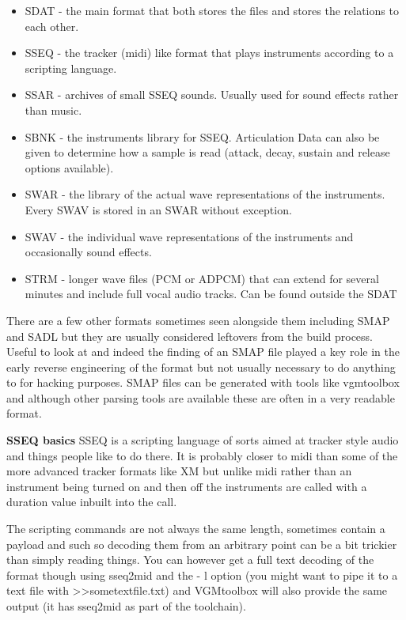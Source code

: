 \documentclass[
]{book}
\providecommand{\tightlist}{%
  \setlength{\itemsep}{0pt}\setlength{\parskip}{0pt}}
\begin{document}
\begin{itemize}
\tightlist
\item
  SDAT - the main format that both stores the files and stores the relations to each other.
\item
  SSEQ - the tracker (midi) like format that plays instruments according to a scripting language.
\item
  SSAR - archives of small SSEQ sounds. Usually used for sound effects rather than music.
\item
  SBNK - the instruments library for SSEQ. Articulation Data can also be given to determine how a sample is read (attack, decay, sustain and release options available).
\item
  SWAR - the library of the actual wave representations of the instruments. Every SWAV is stored in an SWAR without exception.
\item
  SWAV - the individual wave representations of the instruments and occasionally sound effects.
\item
  STRM - longer wave files (PCM or ADPCM) that can extend for several minutes and include full vocal audio tracks. Can be found outside the SDAT
\end{itemize}

There are a few other formats sometimes seen alongside them including SMAP and SADL but they are usually considered leftovers from the build process. Useful to look at and indeed the finding of an SMAP file played a key role in the early reverse engineering of the format but not usually necessary to do anything to for hacking purposes. SMAP files can be generated with tools like vgmtoolbox and although other parsing tools are available these are often in a very readable format.

\textbf{SSEQ basics} SSEQ is a scripting language of sorts aimed at tracker style audio and things people like to do there. It is probably closer to midi than some of the more advanced tracker formats like XM but unlike midi rather than an instrument being turned on and then off the instruments are called with a duration value inbuilt into the call.

The scripting commands are not always the same length, sometimes contain a payload and such so decoding them from an arbitrary point can be a bit trickier than simply reading things. You can however get a full text decoding of the format though using sseq2mid and the - l option (you might want to pipe it to a text file with \textgreater﻿\textgreater sometextfile.txt) and VGMtoolbox will also provide the same output (it has sseq2mid as part of the toolchain).
\end{document}
